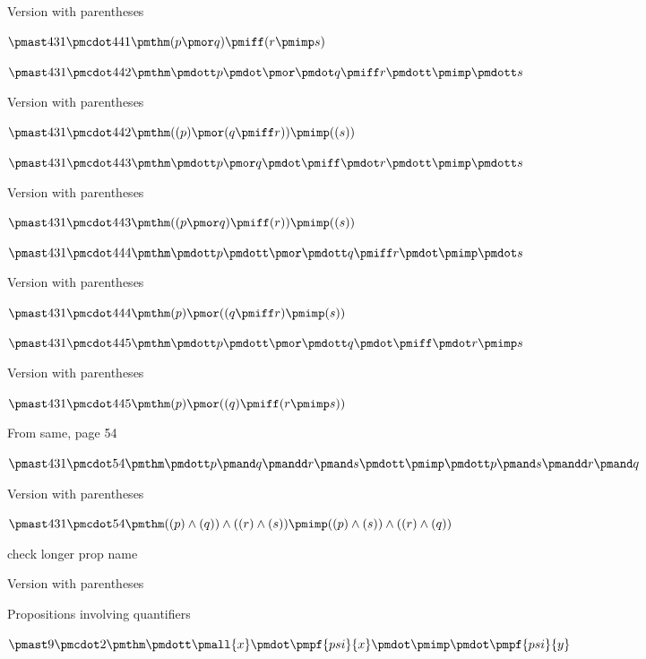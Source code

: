 \documentclass[12pt]{article}
\begin{document}
 

Version with parentheses

$\pmast 431 \pmcdot 441 \pmthm  (  p \pmor q  ) \pmiff (  r \pmimp s)$


$\pmast 431 \pmcdot 442 \pmthm \pmdott p \pmdot \pmor \pmdot q \pmiff r \pmdott \pmimp \pmdott s$
 
 

Version with parentheses

$\pmast 431 \pmcdot 442 \pmthm  ((  p  ) \pmor (  q \pmiff r  )) \pmimp ((  s))$


$\pmast 431 \pmcdot 443 \pmthm \pmdott p \pmor q \pmdot \pmiff \pmdot r \pmdott \pmimp \pmdott s$
 
 

Version with parentheses

$\pmast 431 \pmcdot 443 \pmthm  ((  p \pmor q  ) \pmiff (  r  )) \pmimp ((  s))$


$\pmast 431 \pmcdot 444 \pmthm \pmdott p \pmdott \pmor \pmdott q \pmiff r \pmdot \pmimp \pmdot s$
 
 

Version with parentheses

$\pmast 431 \pmcdot 444 \pmthm  (  p  ) \pmor ((  q \pmiff r  ) \pmimp (  s))$


$\pmast 431 \pmcdot 445 \pmthm \pmdott p \pmdott \pmor \pmdott q \pmdot \pmiff \pmdot r \pmimp s$
 
 

Version with parentheses

$\pmast 431 \pmcdot 445 \pmthm  (  p  ) \pmor ((  q  ) \pmiff (  r \pmimp s))$


From same, page 54

$\pmast 431 \pmcdot 54 \pmthm \pmdott p \pmand q \pmandd r \pmand s \pmdott \pmimp \pmdott p \pmand s \pmandd r \pmand q $
 
 

Version with parentheses

$\pmast 431 \pmcdot 54 \pmthm  ((  p ) \land ( q )) \land (( r ) \land ( s  )) \pmimp ((  p ) \land ( s )) \land (( r ) \land ( q  ))$


check longer prop name

 
 

Version with parentheses



Propositions involving quantifiers

$\pmast 9 \pmcdot 2 \pmthm \pmdott \pmall{x} \pmdot \pmpf{psi}{x} \pmdot \pmimp \pmdot \pmpf{psi}{y} $
 
\end{document}
